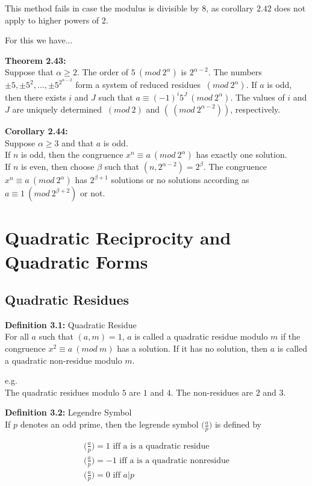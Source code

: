 \documentclass[a4paper]{article}
\begin{document}
This method fails in case the modulus is divisible by $8$, as corollary $2.42$ does not apply to higher powers of $2$.

For this we have...

\textbf{Theorem 2.43:}\\
Suppose that $\alpha\geq 2$. The order of $5 \ (mod\ 2^\alpha)$ is $2^{\alpha-2}$. The numbers $\pm 5,\pm 5^2,...,\pm 5^2^{\alpha-2}$ form a system of reduced residues $\ (mod\ 2^{\alpha})$. If $a$ is odd, then there exists $i$ and $J$ such that $a \equiv  (-1)^i5^J \ (mod\ 2^{\alpha})$. The values of $i$ and $J$ are uniquely determined $\ (mod\ 2)$ and $(\ (mod\ 2^{\alpha-2}))$, respectively.

\textbf{Corollary 2.44:}\\
Suppose $\alpha \geq 3$ and that $a$ is odd.\\
If $n$ is odd, then the congruence $x^n \equiv  a \ (mod\ 2^{\alpha})$ has exactly one solution.\\
If $n$ is even, then choose $\beta$ such that $(n,2^{\alpha-2})=2^\beta$. The congruence $x^n \equiv a \ (mod\ 2^{\alpha})$ has $2^{\beta+1}$ solutions or no solutions according as $a \equiv  1 \ (mod\ 2^{\beta+2})$ or not.


\section{Quadratic Reciprocity and Quadratic Forms}

\subsection{Quadratic Residues}

\textbf{Definition 3.1:} Quadratic Residue\\
For all $a$ such that $(a,m)=1$, $a$ is called a quadratic residue modulo $m$ if the congruence $x^2 \equiv a\ (mod\ m)$ has a solution. If it has no solution, then $a$ is called a quadratic non-residue modulo $m$.

e.g.\\
The quadratic residues modulo $5$ are $1$ and $4$. The non-residues are $2$ and $3$.

\textbf{Definition 3.2:} Legendre Symbol\\
If $p$ denotes an odd prime, then the legrende symbol $\big(\frac{a}{p}\big)$ is defined by

\begin{align*}
    \bigg(\frac{a}{p}\bigg) = 1\text{ iff a is a quadratic residue}\\
    \bigg(\frac{a}{p}\bigg) = -1\text{ iff a is a quadratic nonresidue}\\
    \bigg(\frac{a}{p}\bigg) = 0\text{ iff }a|p
\end{align*}
\end{document}
